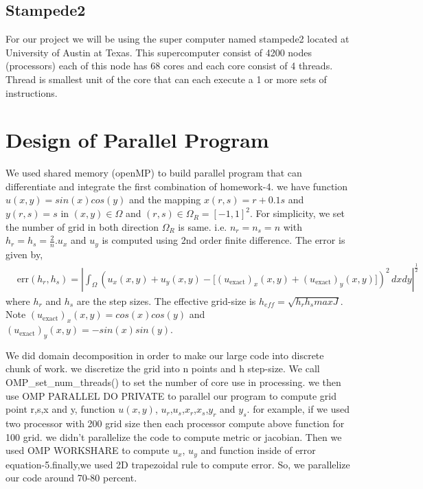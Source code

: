 \documentclass{article}
\begin{document}
\subsection{Stampede2}
For our project we will be using the super computer named stampede2 located at University of Austin at Texas. This supercomputer consist of 4200 nodes (processors) each of this node has 68 cores and each core consist of 4 threads. Thread is smallest unit of the core that can each execute a 1 or more sets of instructions.

 \section{Design of Parallel Program}
We used shared memory (openMP) to build parallel program that can differentiate and integrate the first combination of homework-4. we have function $u(x,y)=sin(x) cos(y)$ and the mapping $x(r,s)=r+0.1s$ and $y(r,s)=s$ in $(x,y)\in\Omega$ and $(r,s)\in\Omega_R=[-1,1]^2$. For simplicity, we set the number of grid in both direction $\Omega_R$ is same. i.e. $n_r=n_s=n$ with $h_r=h_s=\frac{2}{n}$.$u_x$ and $u_y$ is computed using 2nd order finite difference. The error is given by,
\begin{align}
    & \text{err}(h_r, h_s)
        = \left|
            \int_{\Omega}
                \left(
                    u_x(x, y) + u_y(x, y) -
                        \big[
                            (u_\text{exact})_x(x, y) + (u_\text{exact})_y(x, y)
                        \big]
                \right)^2
                \, dx dy \right|^{\tfrac{1}{2}} 
\end{align}
        where $h_r$ and $h_s$ are the step sizes. The effective grid-size is $h_{eff}=\sqrt{h_r h_s maxJ}$. Note  $(u_\text{exact})_x(x, y)= cos(x) cos(y)$ and $(u_\text{exact})_y(x, y)=-sin(x) sin(y)$.

We did domain decomposition in order to make our large code into discrete chunk of work. we discretize the grid into n points and h step-size. We call OMP\_set\_num\_threads() to set the number of core use in processing. we then use OMP PARALLEL DO PRIVATE to parallel our program to compute grid point r,s,x and y, function $u(x,y)$, $u_r$,$u_s$,$x_r$,$x_s$,$y_r$ and $y_s$. for example, if we used two processor with 200 grid size then each processor compute above function for 100 grid. we didn't parallelize the code to compute metric or jacobian. Then we used OMP WORKSHARE to compute $u_x$, $u_y$ and function inside of error equation-5.finally,we used 2D trapezoidal rule to compute error. So, we parallelize our code around 70-80 percent.   
\end{document}

